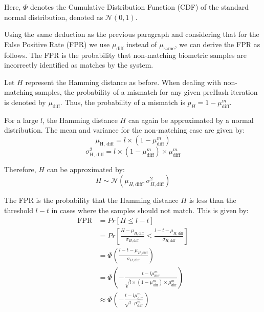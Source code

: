 Here, \(\Phi\) denotes the Cumulative Distribution Function (CDF) of the standard normal distribution, denoted as \(\mathcal{N}(0, 1)\).

Using the same deduction as the previous paragraph and considering that for the False Positive Rate (FPR) we use \(\mu_{\text{diff}}\) instead of \(\mu_{\text{same}}\), we can derive the FPR as follows. The FPR is the probability that non-matching biometric samples are incorrectly identified as matches by the system. 

Let \( H \) represent the Hamming distance as before. When dealing with non-matching samples, the probability of a mismatch for any given preHash iteration is denoted by \( \mu_{\text{diff}} \). Thus, the probability of a mismatch is \( p_H = 1 - \mu_{\text{diff}}^m \).

For a large \( l \), the Hamming distance \( H \) can again be approximated by a normal distribution. The mean and variance for the non-matching case are given by:
\[
\mu_{\text{H, diff}} = l \times (1 - \mu_{\text{diff}}^m)
\]
\[
\sigma_{\text{H, diff}}^2 = l \times (1 - \mu_{\text{diff}}^m) \times \mu_{\text{diff}}^m
\]

Therefore, \( H \) can be approximated by:
\[
H \sim \mathcal{N}(\mu_{H, \text{diff}}, \sigma_{H, \text{diff}}^2)
\]

The FPR is the probability that the Hamming distance \( H \) is less than the threshold \( l - t \) in cases where the samples should not match. This is given by:
\begin{equation}
\begin{aligned}
    \label{eq:fpr}
    \text{FPR} &= Pr[H \leq l - t] \\
    &= Pr\left[\frac{H - \mu_{H, \text{diff}}}{\sigma_{H, \text{diff}}} \leq \frac{l - t - \mu_{H, \text{diff}}}{\sigma_{H, \text{diff}}}\right] \\
    &= \Phi\left(\frac{l - t - \mu_{H, \text{diff}}}{\sigma_{H, \text{diff}}}\right) \\
    &= \Phi\left(-\frac{t - l\mu_{\text{diff}}^m}{\sqrt{l \times (1 - \mu_{\text{diff}}^m) \times \mu_{\text{diff}}^m}}\right)\\
    &\approx\Phi\left(-\frac{t - l\mu_{\text{diff}}^m}{\sqrt{l\cdot \mu_{\text{diff}}^m}}\right)
\end{aligned}
\end{equation}



